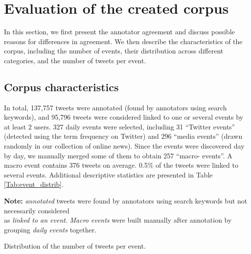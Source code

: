 \section{Evaluation of the created corpus}
\label{Evaluation of the created corpus}

In this section, we first present the annotator agreement and discuss possible reasons for differences in agreement. We then describe  the characteristics of the corpus, including the number of events, their distribution across different categories, and the number of tweets per event. 


	\subsection{Corpus characteristics}
In total, 137,757 tweets were annotated (found by
annotators using search keywords), and 95,796 tweets
were considered linked to one or several events by at least 2 users. 327
daily events were selected, including 31 “Twitter events”
(detected using the term frequency on Twitter) and 296
“media events” (drawn randomly in our collection of
online news). Since the events were discovered day by day, we
manually merged some of them to obtain 257 “macro-
events”. A macro event contains 376 tweets on average. 0.5\%
of the tweets were linked to several events. Additional
descriptive statistics are presented in Table \ref{Tab:event_distrib}.

\begin{table}
\begin{center}
\makebox[\textwidth][c]{}
{\scriptsize \textbf{Note:} \textit{annotated} tweets were found by annotators using search
keywords but not necessarily considered \\as \textit{linked to an event}. \textit{Macro events} were built manually after annotation by grouping \textit{daily events} together.}
\end{center}
\caption{Distribution of the number of tweets per event. \label{Tab:event_distrib}}
\end{table}



%
%

